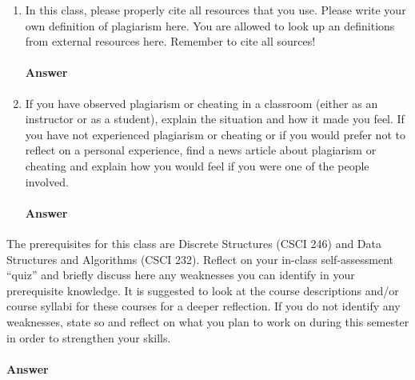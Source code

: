 \documentclass{article}
\begin{document}

\begin{enumerate}

    \item In this class, please properly cite all resources that you use. Please
        write your own definition of plagiarism here. You are allowed to look up
        an definitions from external resources here. Remember to cite all
        sources!

        \paragraph{Answer}
        \todo{}

    \item If you have observed plagiarism or cheating in a classroom (either as
        an instructor or as a student), explain the situation and how it made
        you feel.  If you have not experienced plagiarism or cheating or if you
        would prefer not to reflect on a personal experience, find a news
        article about plagiarism or cheating and explain how you would feel if
        you were one of the people involved.

        \paragraph{Answer}
        \todo{}
\end{enumerate}



The prerequisites for this class are Discrete Structures (CSCI 246) and Data
Structures and Algorithms (CSCI 232). Reflect on your in-class self-assessment
``quiz'' and briefly discuss here any weaknesses you can identify in your
prerequisite knowledge.  It is suggested to look at the course descriptions
and/or course syllabi for these courses for a deeper reflection. If you do not
identify any weaknesses, state so and reflect on what you plan to work on during
this semester in order to strengthen your skills.

\paragraph{Answer}

\todo{}
\end{document}
